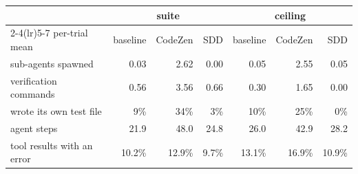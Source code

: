 
\begin{tabular}{@{}lrrrrrr@{}}
\toprule
 & \multicolumn{3}{c}{\textbf{suite}} & \multicolumn{3}{c}{\textbf{ceiling}} \\
\cmidrule(lr){2-4}\cmidrule(lr){5-7}
per-trial mean & baseline & CodeZen & SDD & baseline & CodeZen & SDD \\
\midrule
sub-agents spawned & 0.03 & 2.62 & 0.00 & 0.05 & 2.55 & 0.05 \\
verification commands & 0.56 & 3.56 & 0.66 & 0.30 & 1.65 & 0.00 \\
wrote its own test file & 9\% & 34\% & 3\% & 10\% & 25\% & 0\% \\
agent steps & 21.9 & 48.0 & 24.8 & 26.0 & 42.9 & 28.2 \\
tool results with an error & 10.2\% & 12.9\% & 9.7\% & 13.1\% & 16.9\% & 10.9\% \\
\bottomrule
\end{tabular}

